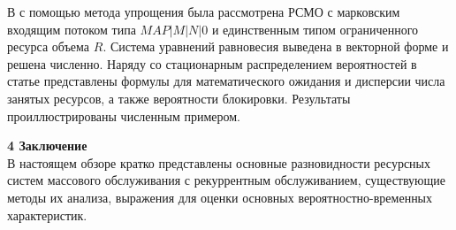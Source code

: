 \documentclass[a4paper,12pt]{article}
\begin{document}
В \cite{Sopin_17_2018} с помощью метода упрощения была рассмотрена РСМО с марковским входящим потоком типа $MAP|M|N|0$ и единственным типом ограниченного ресурса объема $R$. Система уравнений равновесия выведена в векторной форме и решена численно. Наряду со стационарным распределением вероятностей в статье представлены формулы для математического ожидания и дисперсии числа занятых ресурсов, а также вероятности блокировки. Результаты проиллюстрированы численным примером.

\vspace{\baselineskip}     %

\noindent
\textbf{4 Заключение}\\
В настоящем обзоре кратко представлены основные разновидности ресурсных систем массового обслуживания с рекуррентным обслуживанием, существующие методы их анализа, выражения для оценки основных вероятностно-временных характеристик.

\vspace{\baselineskip}     %
\end{document}

